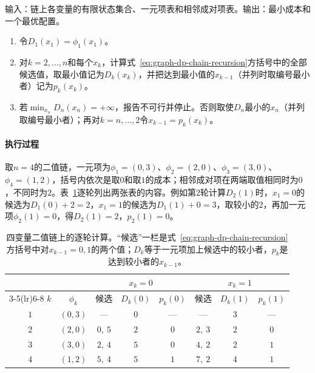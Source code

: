 \begin{algorithm}[链上的最小成本递推]
\label{alg:graph-dp-chain}
输入：链上各变量的有限状态集合、一元项表和相邻成对项表。输出：最小成本和一个最优配置。
\begin{enumerate}
  \item 令$D_1(x_1)=\phi_1(x_1)$。
  \item 对$k=2,\ldots,n$和每个$x_k$，计算式~\eqref{eq:graph-dp-chain-recursion}方括号中的全部候选值，取最小值记为$D_k(x_k)$，并把达到最小值的$x_{k-1}$（并列时取编号最小者）记为$p_k(x_k)$。
  \item 若$\min_{x_n}D_n(x_n)=+\infty$，报告不可行并停止。否则取使$D_n$最小的$x_n$（并列取编号最小者）；再对$k=n,\ldots,2$令$x_{k-1}=p_k(x_k)$。
\end{enumerate}
\end{algorithm}

\paragraph{执行过程}
取$n=4$的二值链，一元项为$\phi_1=(0,3)$、$\phi_2=(2,0)$、$\phi_3=(3,0)$、$\phi_4=(1,2)$，括号内依次是取$0$和取$1$的成本；相邻成对项在两端取值相同时为$0$，不同时为$2$。表~\ref{tab:graph-dp-chain-trace}逐轮列出两张表的内容。例如第$2$轮计算$D_2(1)$时，$x_1=0$的候选为$D_1(0)+2=2$，$x_1=1$的候选为$D_1(1)+0=3$，取较小的$2$，再加一元项$\phi_2(1)=0$，得$D_2(1)=2$，$p_2(1)=0$。

\begin{table}[!htb]
  \centering
  \caption{四变量二值链上的逐轮计算。“候选”一栏是式~\eqref{eq:graph-dp-chain-recursion}方括号中对$x_{k-1}=0,1$的两个值；$D_k$等于一元项加上候选中的较小者，$p_k$是达到较小者的$x_{k-1}$。}
  \label{tab:graph-dp-chain-trace}
  \small
  \begin{tabular}{@{}cccccccc@{}}
    \toprule
    & & \multicolumn{3}{c}{$x_k=0$} & \multicolumn{3}{c}{$x_k=1$}\\
    \cmidrule(lr){3-5}\cmidrule(lr){6-8}
    $k$ & $\phi_k$ & 候选 & $D_k(0)$ & $p_k(0)$ & 候选 & $D_k(1)$ & $p_k(1)$\\
    \midrule
    $1$ & $(0,3)$ & — & $0$ & — & — & $3$ & —\\
    $2$ & $(2,0)$ & $0,\ 5$ & $2$ & $0$ & $2,\ 3$ & $2$ & $0$\\
    $3$ & $(3,0)$ & $2,\ 4$ & $5$ & $0$ & $4,\ 2$ & $2$ & $1$\\
    $4$ & $(1,2)$ & $5,\ 4$ & $5$ & $1$ & $7,\ 2$ & $4$ & $1$\\
    \bottomrule
  \end{tabular}
\end{table}


